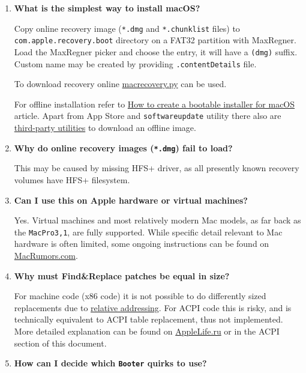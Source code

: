 \documentclass[]{article}
\begin{document}
\begin{enumerate}
\item \label{reinstallmacos}
  \textbf{What is the simplest way to install macOS?}

  Copy online recovery image (\texttt{*.dmg} and \texttt{*.chunklist} files)
  to \texttt{com.apple.recovery.boot} directory on a FAT32 partition with MaxRegner.
  Load the MaxRegner picker and choose the entry, it will have a \texttt{(dmg)} suffix.
  Custom name may be created by providing \texttt{.contentDetails} file.

  To download recovery online
  \href{https://github.com/acidanthera/MaxRegnerPkg/blob/master/Utilities/macrecovery/macrecovery.py}{macrecovery.py}
  can be used.

  For offline installation refer to
  \href{https://support.apple.com/HT201372}{How to create a bootable installer for macOS}
  article. Apart from App Store and \texttt{softwareupdate} utility there also are
  \href{https://github.com/corpnewt/gibMacOS}{third-party utilities} to download an offline image.

\item
  \textbf{Why do online recovery images (\texttt{*.dmg}) fail to load?}

  This may be caused by missing HFS+ driver, as all presently known recovery volumes
  have HFS+ filesystem.

\item
  \textbf{Can I use this on Apple hardware or virtual machines?}

  Yes. Virtual machines and most relatively modern Mac models, as far back as the \texttt{MacPro3,1},
  are fully supported. While specific detail relevant to Mac hardware is often limited,
  some ongoing instructions can be found on
  \href{https://forums.macrumors.com/threads/2207814}{MacRumors.com}.

\item
  \textbf{Why must Find\&Replace patches be equal in size?}

  For machine code (x86 code) it is not possible to do differently sized replacements due to
  \href{https://en.wikipedia.org/w/index.php?title=Relative_addressing}{relative addressing}.
  For ACPI code this is risky, and is technically equivalent to ACPI table replacement,
  thus not implemented. More detailed explanation can be found on
  \href{https://applelife.ru/posts/819790}{AppleLife.ru} or in the ACPI section of this document.

\item
  \textbf{How can I decide which \texttt{Booter} quirks to use?}


\end{enumerate}
\end{document}
